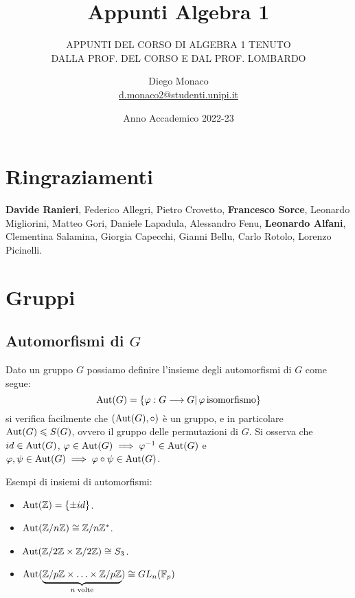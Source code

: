 \documentclass[11pt]{scrartcl}
\begin{document}
\title{Appunti Algebra 1}
\subtitle{\large\normalfont\rmfamily\scshape APPUNTI DEL CORSO DI ALGEBRA 1 TENUTO\\ DALLA PROF. DEL CORSO E DAL PROF. LOMBARDO}
\author{Diego Monaco \\ \textnormal{\href{d.monaco2@studenti.unipi.it}{d.monaco2@studenti.unipi.it}}}
\date{Anno Accademico 2022-23}
\maketitle
\newpage

\tableofcontents
\eject
\newpage

\section*{Ringraziamenti}
\textbf{Davide Ranieri}, Federico Allegri, Pietro Crovetto, \textbf{Francesco Sorce}, Leonardo Migliorini, Matteo Gori, Daniele Lapadula, Alessandro Fenu,
\textbf{Leonardo Alfani}, Clementina Salamina, Giorgia Capecchi, Gianni Bellu, Carlo Rotolo, Lorenzo Picinelli.

\newpage
\section{Gruppi}
\subsection{Automorfismi di $G$}
Dato un gruppo $G$ possiamo definire l'insieme degli automorfismi di $G$ come segue:
    \[ \operatorname{Aut}(G) = \{\varphi : G \longrightarrow G |\, \varphi \, \text{isomorfismo}\}
        \]
si verifica facilmente che $(\operatorname{Aut}(G), \circ)$ è un gruppo, e in particolare $\operatorname{Aut}(G) \leqslant S(G)$,
ovvero il gruppo delle permutazioni di $G$. Si osserva che $id \in \operatorname{Aut}(G)$, $\varphi \in \operatorname{Aut}(G) \implies 
\varphi^{-1} \in \operatorname{Aut}(G)$ e $\varphi,\psi \in \operatorname{Aut}(G) \implies \varphi \circ \psi \in \operatorname{Aut}(G)$.

\begin{example}
    Esempi di insiemi di automorfismi:
        \begin{itemize}
            \item $\operatorname{Aut}(\mathbb Z) = \{\pm id\}$.
            \item $\operatorname{Aut}({\mathbb Z}/n{\mathbb Z}) \cong {\mathbb Z}/n{\mathbb Z}^*$.
            \item $\operatorname{Aut}(\mathbb{Z}/{2}\mathbb{Z} \times \mathbb{Z}/{2}\mathbb{Z}) \cong S_3$.
            \item $\operatorname{Aut}(\underbrace{{\mathbb Z}/p{\mathbb Z} \times \ldots \times {\mathbb Z}/p{\mathbb Z}}_{n \;\text{volte}}) \cong GL_n({\mathbb F}_p)$
        \end{itemize}
\end{example}
\end{document}
